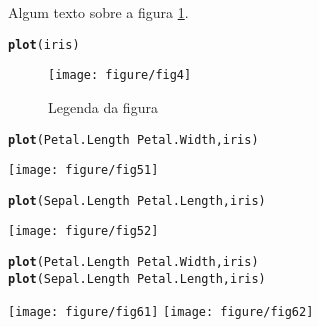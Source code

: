 \documentclass{article}\usepackage[]{graphicx}\usepackage[]{color}
\makeatletter
\newcommand{\hlopt}[1]{\textcolor[rgb]{0,0,0}{#1}}%
\newcommand{\hlstd}[1]{\textcolor[rgb]{0.345,0.345,0.345}{#1}}%
\newcommand{\hlkwd}[1]{\textcolor[rgb]{0.737,0.353,0.396}{\textbf{#1}}}%
\newenvironment{kframe}{%
 \def\at@end@of@kframe{}%
 \ifinner\ifhmode%
  \def\at@end@of@kframe{\end{minipage}}%
  \begin{minipage}{\columnwidth}%
 \fi\fi%
 \def\FrameCommand##1{\hskip\@totalleftmargin \hskip-\fboxsep
 \colorbox{shadecolor}{##1}\hskip-\fboxsep
     \hskip-\linewidth \hskip-\@totalleftmargin \hskip\columnwidth}%
 \MakeFramed {\advance\hsize-\width
   \@totalleftmargin\z@ \linewidth\hsize
   \@setminipage}}%
 {\par\unskip\endMakeFramed%
 \at@end@of@kframe}
\newenvironment{knitrout}{}{} %
\makeatother
\begin{document}
\newpage

Algum texto sobre a figura \ref{fig:fig4}.

\begin{knitrout}
\color{fgcolor}\begin{kframe}
\begin{alltt}
\hlkwd{plot}\hlstd{(iris)}
\end{alltt}
\end{kframe}\begin{figure}[!htb]


{\centering \texttt{[image: figure/fig4]} 

}

\caption[Legenda da figura]{Legenda da figura\label{fig:fig4}}
\end{figure}


\end{knitrout}


\newpage

\begin{knitrout}
\color{fgcolor}\begin{kframe}
\begin{alltt}
\hlkwd{plot}\hlstd{(Petal.Length} \hlopt{~} \hlstd{Petal.Width, iris)}
\end{alltt}
\end{kframe}

{\centering \texttt{[image: figure/fig51]} 

}


\begin{kframe}\begin{alltt}
\hlkwd{plot}\hlstd{(Sepal.Length} \hlopt{~} \hlstd{Petal.Length, iris)}
\end{alltt}
\end{kframe}

{\centering \texttt{[image: figure/fig52]} 

}



\end{knitrout}


\newpage

\begin{knitrout}
\color{fgcolor}\begin{kframe}
\begin{alltt}
\hlkwd{plot}\hlstd{(Petal.Length} \hlopt{~} \hlstd{Petal.Width, iris)}
\hlkwd{plot}\hlstd{(Sepal.Length} \hlopt{~} \hlstd{Petal.Length, iris)}
\end{alltt}
\end{kframe}

{\centering \texttt{[image: figure/fig61]} 
\texttt{[image: figure/fig62]} 

}



\end{knitrout}
\end{document}
